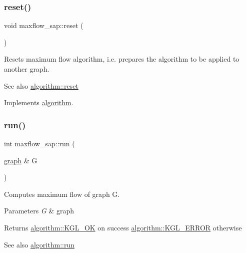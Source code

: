 \subsubsection{\texorpdfstring{reset()}{reset()}}
{\footnotesize\ttfamily void maxflow\+\_\+sap\+::reset (\begin{DoxyParamCaption}{ }\end{DoxyParamCaption})\hspace{0.3cm}{\ttfamily [virtual]}}

Resets maximum flow algorithm, i.\+e. prepares the algorithm to be applied to another graph.

\begin{DoxySeeAlso}{See also}
\mbox{\hyperlink{classalgorithm_a21aba63d066ae7897de6ca7d8425c408}{algorithm\+::reset}} 
\end{DoxySeeAlso}


Implements \mbox{\hyperlink{classalgorithm_a21aba63d066ae7897de6ca7d8425c408}{algorithm}}.

\mbox{\label{classmaxflow__sap_ab4305a2bb370ad9c43cc68d339b2dda0}} 
\subsubsection{\texorpdfstring{run()}{run()}}
{\footnotesize\ttfamily int maxflow\+\_\+sap\+::run (\begin{DoxyParamCaption}\item[{\mbox{\hyperlink{classgraph}{graph}} \&}]{G }\end{DoxyParamCaption})\hspace{0.3cm}{\ttfamily [virtual]}}

Computes maximum flow of graph {\ttfamily G}.


\begin{DoxyParams}{Parameters}
{\em G} & graph \\
\hline
\end{DoxyParams}
\begin{DoxyReturn}{Returns}
{\ttfamily \mbox{\hyperlink{classalgorithm_af1a0078e153aa99c24f9bdf0d97f6710aae4c1cd7fe8d8cf4b143241a6e7c31cf}{algorithm\+::\+K\+G\+L\+\_\+\+OK}}} on success {\ttfamily \mbox{\hyperlink{classalgorithm_af1a0078e153aa99c24f9bdf0d97f6710ae67bf27b2ef31f73e545a7f9f4a69556}{algorithm\+::\+K\+G\+L\+\_\+\+E\+R\+R\+OR}}} otherwise 
\end{DoxyReturn}
\begin{DoxySeeAlso}{See also}
\mbox{\hyperlink{classalgorithm_a734b189509a8d6b56b65f8ff772d43ca}{algorithm\+::run}} 
\end{DoxySeeAlso}


